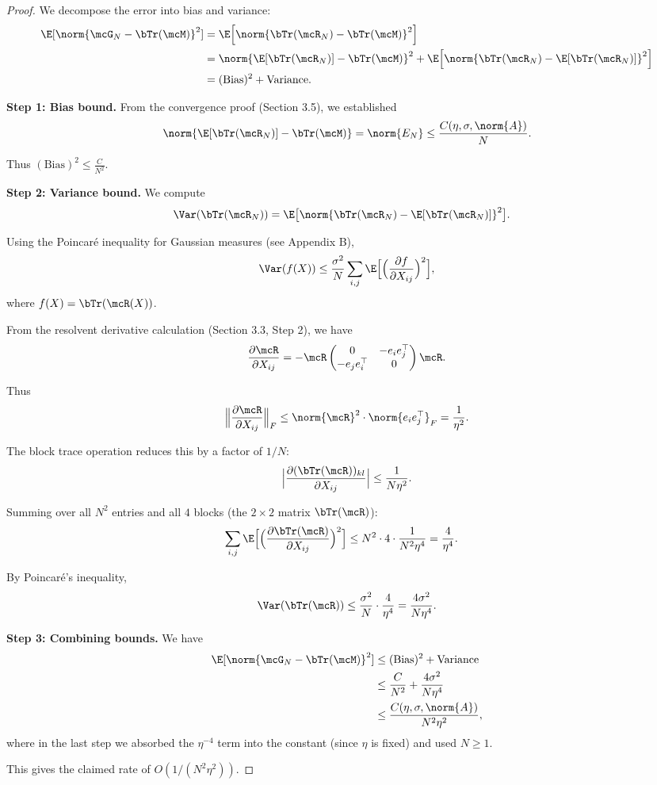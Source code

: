 \begin{proof}
We decompose the error into bias and variance:
\begin{align}
\E[\norm{\mcG_N - \bTr(\mcM)}^2]
&= \E\Bigl[\norm{\bTr(\mcR_N) - \bTr(\mcM)}^2\Bigr] \\
&= \norm{\E[\bTr(\mcR_N)] - \bTr(\mcM)}^2 + \E\Bigl[\norm{\bTr(\mcR_N) - \E[\bTr(\mcR_N)]}^2\Bigr] \\
&= (\text{Bias})^2 + \text{Variance}.
\end{align}

\textbf{Step 1: Bias bound.} From the convergence proof (Section 3.5), we established
\[
\norm{\E[\bTr(\mcR_N)] - \bTr(\mcM)} = \norm{E_N} \leq \frac{C(\eta, \sigma, \norm{A})}{N}.
\]

Thus $(\text{Bias})^2 \leq \frac{C}{N^2}$.

\textbf{Step 2: Variance bound.} We compute
\begin{align}
\Var(\bTr(\mcR_N))
&= \E\bigl[\norm{\bTr(\mcR_N) - \E[\bTr(\mcR_N)]}^2\bigr].
\end{align}

Using the Poincaré inequality for Gaussian measures (see Appendix B),
\[
\Var(f(X)) \leq \frac{\sigma^2}{N} \sum_{i,j} \E\Bigl[\Bigl(\frac{\partial f}{\partial X_{ij}}\Bigr)^2\Bigr],
\]
where $f(X) = \bTr(\mcR(X))$.

From the resolvent derivative calculation (Section 3.3, Step 2), we have
\[
\frac{\partial \mcR}{\partial X_{ij}} = -\mcR \begin{pmatrix} 0 & -e_i e_j^\top \\ -e_j e_i^\top & 0 \end{pmatrix} \mcR.
\]

Thus
\[
\Bigl\|\frac{\partial \mcR}{\partial X_{ij}}\Bigr\|_F \leq \norm{\mcR}^2 \cdot \norm{e_i e_j^\top}_F = \frac{1}{\eta^2}.
\]

The block trace operation reduces this by a factor of $1/N$:
\[
\Bigl|\frac{\partial (\bTr(\mcR))_{kl}}{\partial X_{ij}}\Bigr| \leq \frac{1}{N\eta^2}.
\]

Summing over all $N^2$ entries and all $4$ blocks (the $2 \times 2$ matrix $\bTr(\mcR)$):
\begin{align}
\sum_{i,j} \E\Bigl[\Bigl(\frac{\partial \bTr(\mcR)}{\partial X_{ij}}\Bigr)^2\Bigr]
&\leq N^2 \cdot 4 \cdot \frac{1}{N^2\eta^4} = \frac{4}{\eta^4}.
\end{align}

By Poincaré's inequality,
\[
\Var(\bTr(\mcR)) \leq \frac{\sigma^2}{N} \cdot \frac{4}{\eta^4} = \frac{4\sigma^2}{N\eta^4}.
\]

\textbf{Step 3: Combining bounds.} We have
\begin{align}
\E[\norm{\mcG_N - \bTr(\mcM)}^2]
&\leq (\text{Bias})^2 + \text{Variance} \\
&\leq \frac{C}{N^2} + \frac{4\sigma^2}{N\eta^4} \\
&\leq \frac{C(\eta, \sigma, \norm{A})}{N^2\eta^2},
\end{align}
where in the last step we absorbed the $\eta^{-4}$ term into the constant (since $\eta$ is fixed) and used $N \geq 1$.

This gives the claimed rate of $O(1/(N^2\eta^2))$.
\end{proof}
